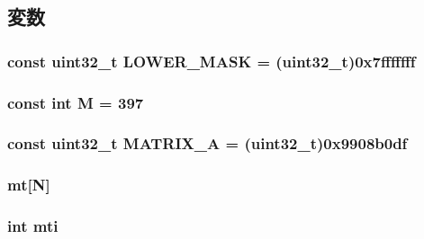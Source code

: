 \subsection{変数}
\hypertarget{classRandom_a121b964de80b4462fdb70f6aec06e71b}{
\subsubsection[{LOWER\_\-MASK}]{\setlength{\rightskip}{0pt plus 5cm}const {\bf uint32\_\-t} {\bf LOWER\_\-MASK} = ({\bf uint32\_\-t})0x7fffffff}}
\label{classRandom_a121b964de80b4462fdb70f6aec06e71b}
\hypertarget{classRandom_a9edc6895d567e0ddcdd3cc20df3f3b4b}{
\subsubsection[{M}]{\setlength{\rightskip}{0pt plus 5cm}const int {\bf M} = 397}}
\label{classRandom_a9edc6895d567e0ddcdd3cc20df3f3b4b}
\hypertarget{classRandom_ad7a9963baa43ec4c81dcf60abe7ab583}{
\subsubsection[{MATRIX\_\-A}]{\setlength{\rightskip}{0pt plus 5cm}const {\bf uint32\_\-t} {\bf MATRIX\_\-A} = ({\bf uint32\_\-t})0x9908b0df}}
\label{classRandom_ad7a9963baa43ec4c81dcf60abe7ab583}
\hypertarget{classRandom_a03c0530d5f0bb5fcc0162a33726528c8}{
\subsubsection[{mt}]{ {\bf mt}\mbox{[}{\bf N}\mbox{]}}}
\label{classRandom_a03c0530d5f0bb5fcc0162a33726528c8}
\hypertarget{classRandom_a0893639c022032e006e5b13378f7b4b2}{
\subsubsection[{mti}]{\setlength{\rightskip}{0pt plus 5cm}int {\bf mti}}}
